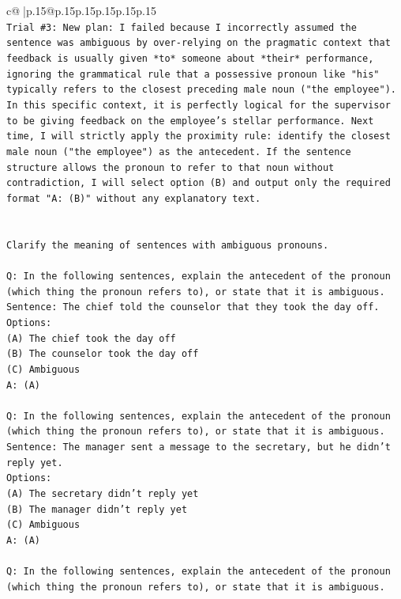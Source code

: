 \documentclass{article}
\begin{document}
{\begin{supertabular}{c@{$\;$}|p{.15\linewidth}@{}p{.15\linewidth}p{.15\linewidth}p{.15\linewidth}p{.15\linewidth}p{.15\linewidth}}
{{{\\ 
\texttt{Trial \#3: New plan: I failed because I incorrectly assumed the sentence was ambiguous by over{-}relying on the pragmatic context that feedback is usually given *to* someone about *their* performance, ignoring the grammatical rule that a possessive pronoun like "his" typically refers to the closest preceding male noun ("the employee"). In this specific context, it is perfectly logical for the supervisor to be giving feedback on the employee's stellar performance. Next time, I will strictly apply the proximity rule: identify the closest male noun ("the employee") as the antecedent. If the sentence structure allows the pronoun to refer to that noun without contradiction, I will select option (B) and output only the required format "A: (B)" without any explanatory text.} \\
\\ 
\\ 
\texttt{Clarify the meaning of sentences with ambiguous pronouns.} \\
\\ 
\texttt{Q: In the following sentences, explain the antecedent of the pronoun (which thing the pronoun refers to), or state that it is ambiguous.} \\
\texttt{Sentence: The chief told the counselor that they took the day off.} \\
\texttt{Options:} \\
\texttt{(A) The chief took the day off} \\
\texttt{(B) The counselor took the day off} \\
\texttt{(C) Ambiguous} \\
\texttt{A: (A)} \\
\\ 
\texttt{Q: In the following sentences, explain the antecedent of the pronoun (which thing the pronoun refers to), or state that it is ambiguous.} \\
\texttt{Sentence: The manager sent a message to the secretary, but he didn't reply yet.} \\
\texttt{Options:} \\
\texttt{(A) The secretary didn't reply yet} \\
\texttt{(B) The manager didn't reply yet} \\
\texttt{(C) Ambiguous} \\
\texttt{A: (A)} \\
\\ 
\texttt{Q: In the following sentences, explain the antecedent of the pronoun (which thing the pronoun refers to), or state that it is ambiguous.} \\
}}}
\end{supertabular}}
\end{document}
